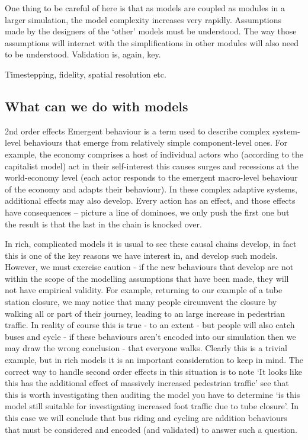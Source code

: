 One thing to be careful of here is that as models are coupled as modules in a
larger simulation, the model complexity increases very rapidly. Assumptions
made by the designers of the ‘other’ models must be understood. The way those
assumptions will interact with the simplifications in other modules will also
need to be understood. Validation is, again, key.

\color{red} Timestepping, fidelity, spatial resolution etc. \color{black}

\subsection{What can we do with models} 

2nd order effects Emergent behaviour is a term
used to describe complex system-level behaviours that emerge from relatively
simple component-level ones. For example, the economy comprises a host of
individual actors who (according to the capitalist model) act in their
self-interest this causes surges and recessions at the world-economy level
(each actor responds to the emergent macro-level behaviour of the economy and
adapts their behaviour). In these complex adaptive systems, additional effects
may also develop. Every action has an effect, and those effects have
consequences -- picture a line of dominoes, we only push the first one but the
result is that the last in the chain is knocked over.

In rich, complicated models it is usual to see these causal chains develop, in
fact this is one of the key reasons we have interest in, and develop such
models. However, we must exercise caution - if the new behaviours that develop
are not within the scope of the modelling assumptions that have been made, they
will not have empirical validity. For example, returning to our example of a
tube station closure, we may notice that many people circumvent the closure by
walking all or part of their journey, leading to an large increase in
pedestrian traffic. In reality of course this is true - to an extent - but
people will also catch buses and cycle - if these behaviours aren’t encoded
into our simulation then we may draw the wrong conclusion - that everyone
walks. Clearly this is a trivial example, but in rich models it is an important
consideration to keep in mind. The correct way to handle second order effects
in this situation is to note ‘It looks like this has the additional effect of
massively increased pedestrian traffic’ see that this is worth investigating
then auditing the model you have to determine ‘is this model still suitable for
investigating increased foot traffic due to tube closure’. In this case we will
conclude that bus riding and cycling are addition behaviours that must be
considered and encoded (and validated) to answer such a question.


